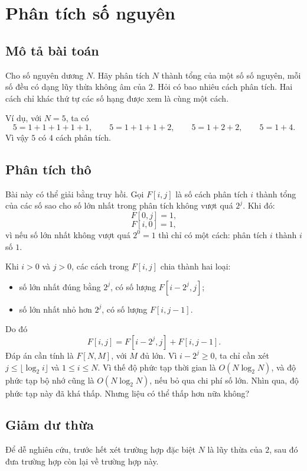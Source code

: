 \documentclass[11pt]{article}
\begin{document}
\section{Phân tích số nguyên}

\subsection{Mô tả bài toán}

Cho số nguyên dương $N$. Hãy phân tích $N$ thành tổng của một số số nguyên,
mỗi số đều có dạng lũy thừa không âm của $2$. Hỏi có bao nhiêu cách phân tích.
Hai cách chỉ khác thứ tự các số hạng được xem là cùng một cách.

Ví dụ, với $N=5$, ta có
\[
  5=1+1+1+1+1,\qquad
  5=1+1+1+2,\qquad
  5=1+2+2,\qquad
  5=1+4.
\]
Vì vậy $5$ có $4$ cách phân tích.

\subsection{Phân tích thô}

Bài này có thể giải bằng truy hồi. Gọi $F[i,j]$ là số cách phân tích $i$ thành
tổng của các số sao cho số lớn nhất trong phân tích không vượt quá $2^j$.
Khi đó:
\[
  F[0,j]=1,
\]
\[
  F[i,0]=1,
\]
vì nếu số lớn nhất không vượt quá $2^0=1$ thì chỉ có một cách: phân tích $i$
thành $i$ số $1$.

Khi $i>0$ và $j>0$, các cách trong $F[i,j]$ chia thành hai loại:
\begin{itemize}
  \item số lớn nhất đúng bằng $2^j$, có số lượng $F[i-2^j,j]$;
  \item số lớn nhất nhỏ hơn $2^j$, có số lượng $F[i,j-1]$.
\end{itemize}
Do đó
\[
  F[i,j]=F[i-2^j,j]+F[i,j-1].
\]
Đáp án cần tính là $F[N,M]$, với $M$ đủ lớn. Vì $i-2^j\ge 0$, ta chỉ cần xét
$j\le \lfloor\log_2 i\rfloor$ và $1\le i\le N$. Vì thế độ phức tạp thời gian
là $O(N\log_2 N)$, và độ phức tạp bộ nhớ cũng là $O(N\log_2 N)$, nếu bỏ qua
chi phí số lớn. Nhìn qua, độ phức tạp này đã khá thấp. Nhưng liệu có thể thấp
hơn nữa không?

\subsection{Giảm dư thừa}

Để dễ nghiên cứu, trước hết xét trường hợp đặc biệt $N$ là lũy thừa của $2$,
sau đó đưa trường hợp còn lại về trường hợp này.
\end{document}
